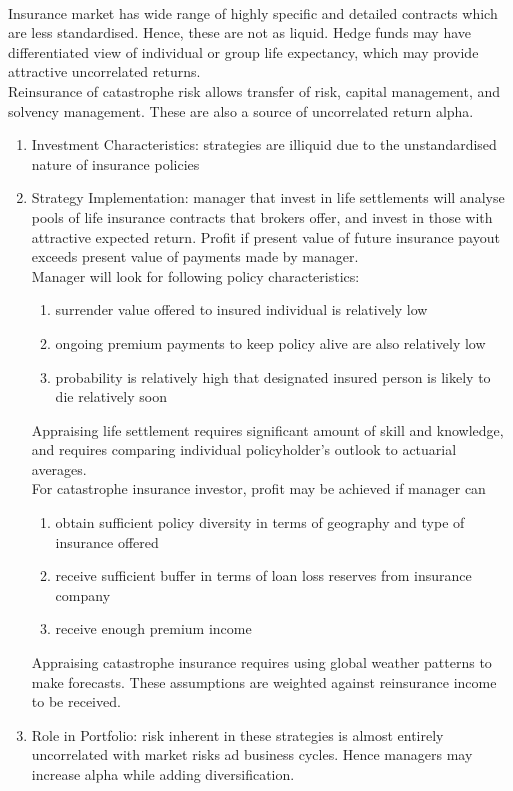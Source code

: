 \begin{remark} \\
Insurance market has wide range of highly specific and detailed contracts which are less standardised. Hence, these are not as liquid. Hedge funds may have differentiated view of individual or group life expectancy, which may provide attractive uncorrelated returns.\\
Reinsurance of catastrophe risk allows transfer of risk, capital management, and solvency management. These are also a source of uncorrelated return alpha.
\begin{enumerate}[label=\roman*.]
\setlength{\itemsep}{0pt}
\item Investment Characteristics: strategies are illiquid due to the unstandardised nature of insurance policies
\item Strategy Implementation: manager that invest in life settlements will analyse pools of life insurance contracts that brokers offer, and invest in those with attractive expected return. Profit if present value of future insurance payout exceeds present value of payments made by manager.\\
Manager will look for following policy characteristics:
\begin{enumerate}[label=\arabic*.]
\setlength{\itemsep}{0pt}
\item surrender value offered to insured individual is relatively low
\item ongoing premium payments to keep policy alive are also relatively low
\item probability is relatively high that designated insured person is likely to die relatively soon
\end{enumerate}
Appraising life settlement requires significant amount of skill and knowledge, and requires comparing individual policyholder's outlook to actuarial averages.\\
For catastrophe insurance investor, profit may be achieved if manager can
\begin{enumerate}[label=\arabic*.]
\setlength{\itemsep}{0pt}
\item obtain sufficient policy diversity in terms of geography and type of insurance offered
\item receive sufficient buffer in terms of loan loss reserves from insurance company
\item receive enough premium income
\end{enumerate}
Appraising catastrophe insurance requires using global weather patterns to make forecasts. These assumptions are weighted against reinsurance income to be received.
\item Role in Portfolio: risk inherent in these strategies is almost entirely uncorrelated with market risks ad business cycles. Hence managers may increase alpha while adding diversification.
\end{enumerate}
\end{remark}

